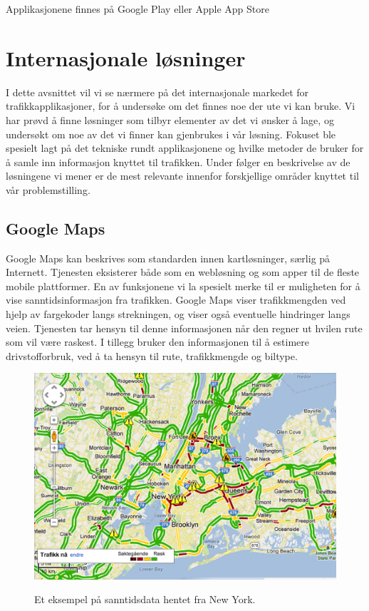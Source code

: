 \documentclass[a4paper,norsk,oneside]{book}
\begin{document}
Applikasjonene finnes på Google Play eller Apple App Store


\section{Internasjonale løsninger}
I dette avsnittet vil vi se nærmere på det internasjonale markedet for trafikkapplikasjoner, for å undersøke om det finnes noe der ute vi kan bruke. Vi har prøvd å finne løsninger som tilbyr elementer av det vi ønsker å lage, og undersøkt om noe av det vi finner kan gjenbrukes i vår løsning. Fokuset ble spesielt lagt på det tekniske rundt applikasjonene og hvilke metoder de bruker for å samle inn informasjon knyttet til trafikken. Under følger en beskrivelse av de løsningene vi mener er de mest relevante innenfor forskjellige områder knyttet til vår problemstilling.

\subsection{Google Maps}
Google Maps kan beskrives som standarden innen kartløsninger, særlig på Internett. Tjenesten eksisterer både som en webløsning og som apper til de fleste mobile plattformer. En av funksjonene vi la spesielt merke til er muligheten for å vise sanntidsinformasjon fra trafikken. Google Maps viser trafikkmengden ved hjelp av fargekoder langs strekningen, og viser også eventuelle hindringer langs veien. Tjenesten tar hensyn til denne informasjonen når den regner ut hvilen rute som vil være raskest. I tillegg bruker den informasjonen til å estimere drivstofforbruk, ved å ta hensyn til rute, trafikkmengde og biltype.

\begin{figure}[H]
\centering
\includegraphics[scale=0.5]{figs/google_maps1.png}
\label{gmaps1}
\caption{Et eksempel på sanntidsdata hentet fra New York.}
\end{figure}
\end{document}
